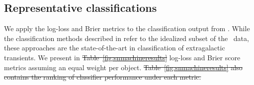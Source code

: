 


\subsection{Representative classifications}
\label{sec:realresults}

We apply the log-loss and Brier metrics to the classification output from \snmachine. While the classification methods described in \citet{lochner_photometric_2016} refer to the idealized subset of the \snphotcc\ data, these approaches are the state-of-the-art in classification of extragalactic transients.
We present in \sout{Table~\ref{fig:snmachineresults}} log-loss and Brier score metrics assuming an equal weight per object.
\sout{Table~\ref{fig:snmachineresults} also contains the ranking of classifier performance under each metric.}

